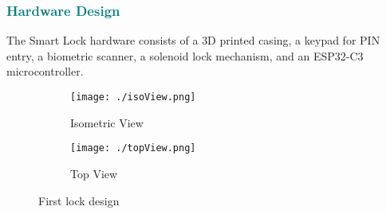 \subsubsection{\textcolor{teal}{Hardware Design}}

The Smart Lock hardware consists of a 3D printed casing, a keypad for PIN entry, a biometric scanner, a solenoid lock mechanism, and an ESP32-C3 microcontroller.

\begin{figure}[htbp]
    \centering
    \begin{subfigure}[b]{0.48\textwidth}
        \texttt{[image: ./isoView.png]}
        \caption{Isometric View}
        \label{fig:isoView}
    \end{subfigure}
    \hfill
    \begin{subfigure}[b]{0.48\textwidth}
        \texttt{[image: ./topView.png]}
        \caption{Top View}
        \label{fig:topView}
    \end{subfigure}
    \caption{First lock design}
\end{figure}
